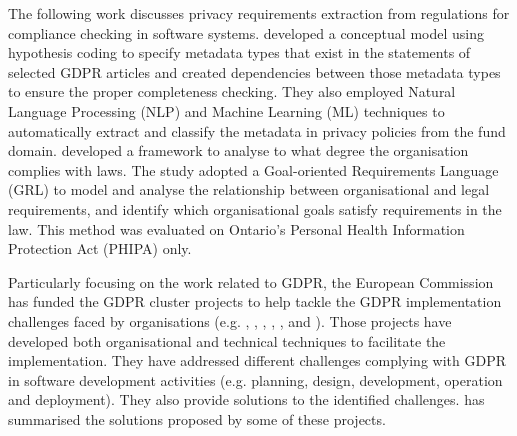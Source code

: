 The following work discusses privacy requirements extraction from regulations for compliance checking in software systems. \citeauthor{Torre} \cite{Torre} developed a conceptual model using hypothesis coding to specify metadata types that exist in the statements of selected GDPR articles and created dependencies between those metadata types to ensure the proper completeness checking. They also employed Natural Language Processing (NLP) and Machine Learning (ML) techniques to automatically extract and classify the metadata in privacy policies from the fund domain. \citeauthor{Ghanavati2009} \cite{Ghanavati2009} developed a framework to analyse to what degree the organisation complies with laws. The study adopted a Goal-oriented Requirements Language (GRL) to model and analyse the relationship between organisational and legal requirements, and identify which organisational goals satisfy requirements in the law. This method was evaluated on Ontario's Personal Health Information Protection Act (PHIPA) only. 

Particularly focusing on the work related to GDPR, the European Commission has funded the GDPR cluster projects to help tackle the GDPR implementation challenges faced by organisations (e.g. \cite{BPR4GDPR}, \cite{DEFEND}, \cite{SMOOTH}, \cite{PDP4E}, \cite{PAPAYA}, \cite{POSEIDON} and \cite{Gharib2016a}). Those projects have developed both organisational and technical techniques to facilitate the implementation. They have addressed different challenges complying with GDPR in software development activities (e.g. planning, design, development, operation and deployment). They also provide solutions to the identified challenges. \citeauthor{EUcluster2020} \cite{EUcluster2020} has summarised the solutions proposed by some of these projects. 	



